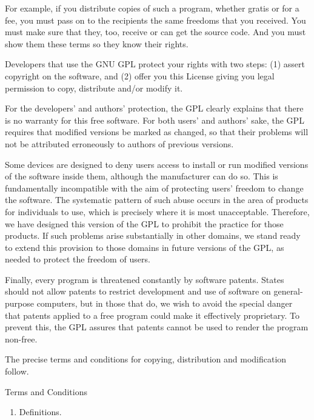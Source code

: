 \documentclass[11pt,twoside,fleqn,openright,titlepage]{cslreport}
\begin{document}
\begin{small}
For example, if you distribute copies of such a program, whether
gratis or for a fee, you must pass on to the recipients the same
freedoms that you received.  You must make sure that they, too, receive
or can get the source code.  And you must show them these terms so they
know their rights.

Developers that use the GNU GPL protect your rights with two steps:
(1) assert copyright on the software, and (2) offer you this License
giving you legal permission to copy, distribute and/or modify it.

For the developers' and authors' protection, the GPL clearly explains
that there is no warranty for this free software.  For both users' and
authors' sake, the GPL requires that modified versions be marked as
changed, so that their problems will not be attributed erroneously to
authors of previous versions.

Some devices are designed to deny users access to install or run
modified versions of the software inside them, although the manufacturer
can do so.  This is fundamentally incompatible with the aim of
protecting users' freedom to change the software.  The systematic
pattern of such abuse occurs in the area of products for individuals to
use, which is precisely where it is most unacceptable.  Therefore, we
have designed this version of the GPL to prohibit the practice for those
products.  If such problems arise substantially in other domains, we
stand ready to extend this provision to those domains in future versions
of the GPL, as needed to protect the freedom of users.

Finally, every program is threatened constantly by software patents.
States should not allow patents to restrict development and use of
software on general-purpose computers, but in those that do, we wish to
avoid the special danger that patents applied to a free program could
make it effectively proprietary.  To prevent this, the GPL assures that
patents cannot be used to render the program non-free.

The precise terms and conditions for copying, distribution and
modification follow.


\begin{center}
{\Large \sc Terms and Conditions}
\end{center}

\begin{enumerate}

\addtocounter{enumi}{-1}

\item Definitions.


\end{enumerate}
\end{small}
\end{document}
